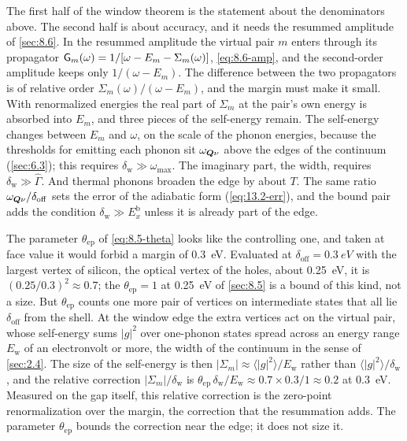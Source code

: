 \noindent The first half of the window theorem is the statement about the denominators above. The second half is about accuracy, and it needs the resummed amplitude of \cref{sec:8.6}. In the resummed amplitude the virtual pair $m$ enters through its propagator $\mathsf{G}_m(\omega) = 1/[\omega - E_m - \Sigma_m(\omega)]$, \cref{eq:8.6-amp}, and the second-order amplitude keeps only $1/(\omega - E_m)$. The difference between the two propagators is of relative order $\Sigma_m(\omega)/(\omega - E_m)$, and the margin must make it small. With renormalized energies the real part of $\Sigma_m$ at the pair's own energy is absorbed into $E_m$, and three pieces of the self-energy remain. The self-energy changes between $E_m$ and $\omega$, on the scale of the phonon energies, because the thresholds for emitting each phonon sit $\omega_{\bm{Q}\nu}$ above the edges of the continuum (\cref{sec:6.3}); this requires $\delta_{\mathrm{w}} \gg \omega_{\max}$. The imaginary part, the width, requires $\delta_{\mathrm{w}} \gg \hat\varGamma$. And thermal phonons broaden the edge by about $T$. The same ratio $\omega_{\bm{Q}\nu}/\delta_{\mathrm{off}}$ sets the error of the adiabatic form (\cref{eq:13.2-err}), and the bound pair adds the condition $\delta_{\mathrm{w}} \gg E_x^{\mathrm{b}}$ unless it is already part of the edge.

The parameter $\theta_{\mathrm{ep}}$ of \cref{eq:8.5-theta} looks like the controlling one, and taken at face value it would forbid a margin of \SI{0.3}{eV}. Evaluated at $\delta_{\mathrm{off}} = \SI{0.3}{eV}$ with the largest vertex of silicon, the optical vertex of the holes, about \SI{0.25}{eV}, it is $(0.25/0.3)^2 \approx 0.7$; the $\theta_{\mathrm{ep}} = 1$ at \SI{0.25}{eV} of \cref{sec:8.5} is a bound of this kind, not a size. But $\theta_{\mathrm{ep}}$ counts one more pair of vertices on intermediate states that all lie $\delta_{\mathrm{off}}$ from the shell. At the window edge the extra vertices act on the virtual pair, whose self-energy sums $|g|^2$ over one-phonon states spread across an energy range $E_{\mathrm{w}}$ of an electronvolt or more, the width of the continuum in the sense of \cref{sec:2.4}. The size of the self-energy is then $|\Sigma_m| \approx \langle|g|^2\rangle/E_{\mathrm{w}}$ rather than $\langle|g|^2\rangle/\delta_{\mathrm{w}}$, and the relative correction $|\Sigma_m|/\delta_{\mathrm{w}}$ is $\theta_{\mathrm{ep}}\,\delta_{\mathrm{w}}/E_{\mathrm{w}} \approx 0.7\times0.3/1 \approx 0.2$ at \SI{0.3}{eV}. Measured on the gap itself, this relative correction is the zero-point renormalization over the margin, the correction that the resummation adds. The parameter $\theta_{\mathrm{ep}}$ bounds the correction near the edge; it does not size it.

